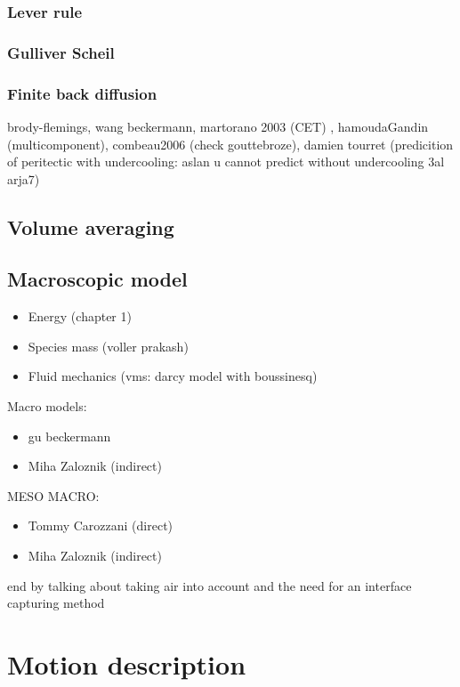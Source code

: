 \subsubsection*{Lever rule}
\subsubsection*{Gulliver Scheil}
\subsubsection*{Finite back diffusion}
brody-flemings, wang beckermann, martorano 2003 (CET) , hamoudaGandin (multicomponent), combeau2006 (check gouttebroze), damien tourret (predicition of peritectic with undercooling: aslan u cannot predict without undercooling 3al arja7) 

\subsection{Volume averaging}

\subsection{Macroscopic model}
\begin{itemize}
\item Energy (chapter 1)
\item Species mass (voller prakash) 
\item Fluid mechanics (vms: darcy model with boussinesq)
\end{itemize}

Macro models:
\begin{itemize}
\item gu beckermann
\item Miha Zaloznik (indirect)
\end{itemize}

MESO MACRO: 
\begin{itemize}
\item Tommy Carozzani (direct)
\item Miha Zaloznik (indirect)
\end{itemize}



end by talking about taking air into account and the need for an interface capturing method


\section{Motion description}
